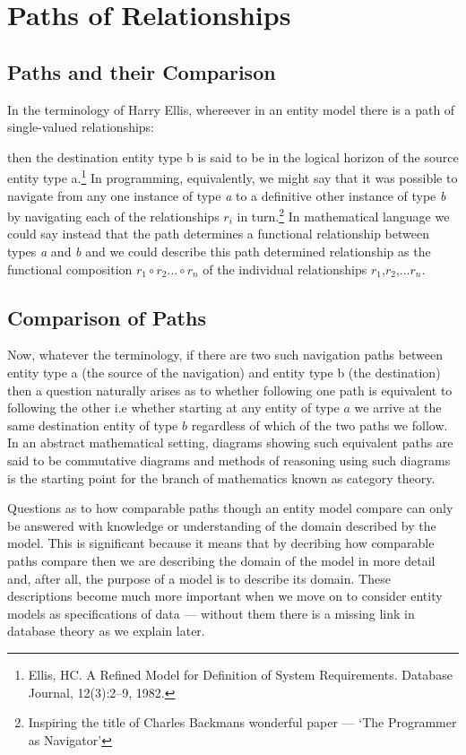 
\section{Paths of Relationships}
\label{PathsofRelationships}
\subsection{Paths and their Comparison}
\mynote
In the terminology of Harry Ellis, whereever in an entity model there is a path of single-valued relationships:
\begin{center}

\end{center}
then the destination entity type b is said to be in the logical horizon of the source entity type a.\footnote{Ellis, HC. A Refined Model for Definition of System Requirements. Database Journal, 12(3):2--9, 1982.}
In programming, equivalently, we might say that it was possible to navigate from any one instance of type \textit{a} to a definitive other instance of type \textit{b} by navigating each of the relationships $r_i$ in turn.\footnote{Inspiring the title of Charles Backmans wonderful paper --- `The Programmer as Navigator'}
 In mathematical language we could say instead that the path determines a functional relationship between types
\textit{a} and \textit{b} and we could describe this path determined relationship as the functional composition $r_1 \circ r_2 ... \circ r_n$ of the individual relationships $r_1$,$r_2$,...$r_n$.
\subsection{Comparison of Paths}
\mynote
Now, whatever the terminology, if there are two such navigation paths between entity type a (the source
of the navigation) and entity type b (the destination) then a question naturally arises as to whether following one path is equivalent to following the other i.e whether starting at any entity of type $a$ we arrive at the same destination entity of type $b$ regardless of which of the two paths we follow. In an abstract mathematical setting, diagrams showing such equivalent paths are said to be commutative diagrams and methods of reasoning using such diagrams is the starting point for the branch of mathematics known as category theory.

\mynote
Questions as to how comparable paths though an entity model compare can only be answered with knowledge or understanding of the domain described by the model. This is significant because it means that by decribing how comparable paths compare then we are describing the domain of the model in more detail and, after all, the purpose of a model is to describe its domain. 
These descriptions become much more important when we move on to consider entity models as specifications of data --- without them there is a missing link in database theory as we explain later. 

